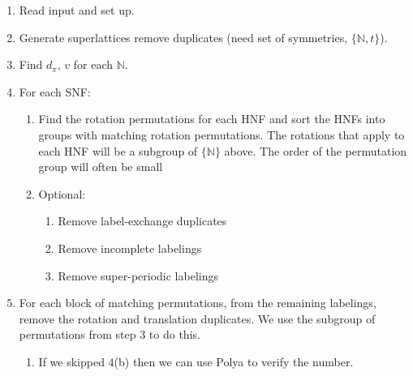 \documentclass{article}
\begin{document}
\begin{enumerate}
\item Read input and set up.
\item Generate superlattices remove duplicates (need set of symmetries, $\{\mathbb{N},t\}$). 
\item Find $d_{\pi}$, $v$ for each $\mathbb{N}$.
\item For each SNF:
  \begin{enumerate}
  \item Find the rotation permutations for each HNF and sort the HNFs into groups with matching
    rotation permutations. The rotations that apply to each HNF will be a subgroup of
    $\{\mathbb{N}\}$ above. The order of the permutation group will often be small
  \item Optional:
    \begin{enumerate}
    \item Remove label-exchange duplicates
    \item Remove incomplete labelings
    \item Remove super-periodic labelings
    \end{enumerate}
  \end{enumerate}
\item For each block of matching permutations, from the remaining labelings, remove the rotation and
  translation duplicates. We use the subgroup of permutations from step 3 to do this.
\begin{enumerate}
\item If we skipped 4(b) then we can use Polya to verify the number.
\end{enumerate}

\end{enumerate}
\end{document}
